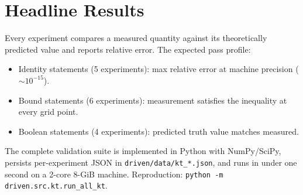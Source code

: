 \documentclass[twocolumn,11pt,a4paper]{article}
\begin{document}
\section{Headline Results}
\label{sec:headline-results}

Every experiment compares a measured quantity against its theoretically predicted value and reports relative error. The expected pass profile:
\begin{itemize}[nosep]
\item Identity statements (5 experiments): max relative error at machine precision ($\sim 10^{-15}$).
\item Bound statements (6 experiments): measurement satisfies the inequality at every grid point.
\item Boolean statements (4 experiments): predicted truth value matches measured.
\end{itemize}

The complete validation suite is implemented in Python with NumPy/SciPy, persists per-experiment JSON in \texttt{driven/data/kt\_*.json}, and runs in under one second on a 2-core 8-GiB machine. Reproduction: \texttt{python -m driven.src.kt.run\_all\_kt}.
\end{document}

